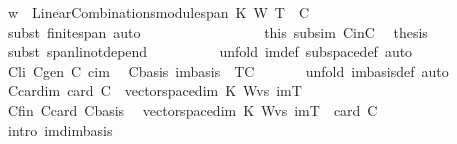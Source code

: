 \begin{isabellebody}
\ {\isachardoublequoteopen}w\ {\isasymin}\ LinearCombinations{\isachardot}module{\isachardot}span\ K\ W\ {\isacharparenleft}T\ {\isacharbackquote}\ C{\isacharparenright}{\isachardoublequoteclose}\ \isanewline
\ \ \ \ \ \ \ \ \ \ \isamarkupfalse%
\ {\isacharparenleft}subst\ finite{\isacharunderscore}span{\isacharcomma}\ auto{\isacharparenright}\isanewline
\ \ \ \ \ \ \isamarkupfalse%
\isanewline
\ \ \ \ \isamarkupfalse%
\isanewline
\ \ \ \ \isamarkupfalse%
\ this\ subs{\isacharunderscore}im\ CinC\ \isamarkupfalse%
\ {\isacharquery}thesis\ \isanewline
\ \ \ \ \ \ \isamarkupfalse%
\ {\isacharparenleft}subst\ span{\isacharunderscore}li{\isacharunderscore}not{\isacharunderscore}depend{\isacharparenleft}{}{\isacharparenright}{\isacharparenright}\isanewline
\ \ \ \ \ \ \ \ \isamarkupfalse%
\ {\isacharparenleft}unfold\ im{\isacharunderscore}def\ subspace{\isacharunderscore}def{\isacharcomma}\ auto{\isacharparenright}\isanewline
\ \ \isamarkupfalse%
\isanewline
\ \ \isamarkupfalse%
\ C{\isacharprime}{\isacharunderscore}li\ C{\isacharprime}{\isacharunderscore}gen\ C\ cim\ \isamarkupfalse%
\ C{\isacharprime}{\isacharunderscore}basis{\isacharcolon}\ {\isachardoublequoteopen}im{\isachardot}basis\ \ {\isacharparenleft}T{\isacharbackquote}C{\isacharparenright}{\isachardoublequoteclose}\ \isanewline
\ \ \ \ \isamarkupfalse%
\ {\isacharparenleft}unfold\ im{\isachardot}basis{\isacharunderscore}def{\isacharcomma}\ auto{\isacharparenright}\isanewline
\ \ \isamarkupfalse%
\ C{\isacharunderscore}card{\isacharunderscore}im{\isacharcolon}\ {\isachardoublequoteopen}card\ C\ {\isacharequal}\ {\isacharparenleft}vectorspace{\isachardot}dim\ K\ {\isacharparenleft}W{\isachardot}vs\ imT{\isacharparenright}{\isacharparenright}{\isachardoublequoteclose}\isanewline
\ \ \isamarkupfalse%
\ {\isacharminus}\ \isanewline
\ \ \ \ \isamarkupfalse%
\ C{\isacharprime}fin\ C{\isacharprime}{\isacharunderscore}card\ C{\isacharprime}{\isacharunderscore}basis\ \isamarkupfalse%
\ {\isachardoublequoteopen}vectorspace{\isachardot}dim\ K\ {\isacharparenleft}W{\isachardot}vs\ imT{\isacharparenright}\ {\isacharequal}\ card\ {\isacharquery}C{\isacharprime}{\isachardoublequoteclose}\ \isanewline
\ \ \ \ \ \ \isamarkupfalse%
\ {\isacharparenleft}intro\ im{\isachardot}dim{\isacharunderscore}basis{\isacharparenright}\ \isanewline
\ \ \ \ \ \ \ \isamarkupfalse%

\end{isabellebody}

